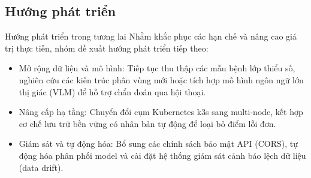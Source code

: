 \subsection{Hướng phát triển}
\begin{frame}{Hướng phát triển trong tương lai}
  \justifying
  Nhằm khắc phục các hạn chế và nâng cao giá trị thực tiễn, nhóm đề xuất hướng phát triển tiếp theo:
  \vspace{0.3cm}
  \begin{itemize}
    \setlength{\itemsep}{8pt}
    \item[-] Mở rộng dữ liệu và mô hình: Tiếp tục thu thập các mẫu bệnh lớp thiểu số, nghiên cứu các kiến trúc phân vùng mới hoặc tích hợp mô hình ngôn ngữ lớn thị giác (VLM) để hỗ trợ chẩn đoán qua hội thoại.
    \item[-] Nâng cấp hạ tầng: Chuyển đổi cụm Kubernetes k3s sang multi-node, kết hợp cơ chế lưu trữ bền vững có nhân bản tự động để loại bỏ điểm lỗi đơn.
    \item[-] Giám sát và tự động hóa: Bổ sung các chính sách bảo mật API (CORS), tự động hóa phân phối model và cài đặt hệ thống giám sát cảnh báo lệch dữ liệu (data drift).
  \end{itemize}
\end{frame}
